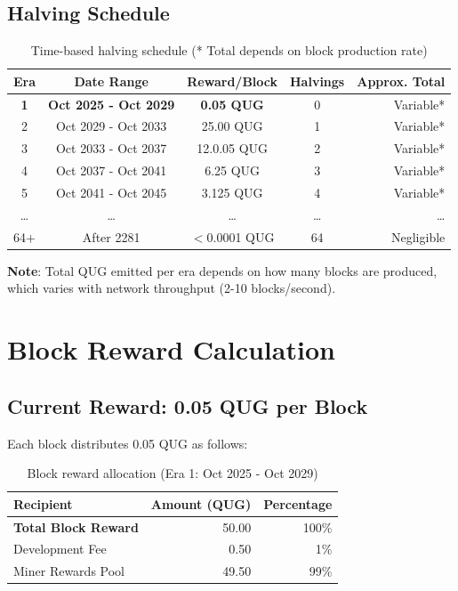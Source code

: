 \documentclass[11pt,a4paper]{article}
\begin{document}
\subsection{Halving Schedule}

\begin{table}[h]
\centering
\small
\begin{tabular}{ccccr}
\toprule
\textbf{Era} & \textbf{Date Range} & \textbf{Reward/Block} & \textbf{Halvings} & \textbf{Approx. Total} \\
\midrule
\textbf{1} & \textbf{Oct 2025 - Oct 2029} & \textbf{0.05 QUG} & 0 & Variable* \\
2 & Oct 2029 - Oct 2033 & 25.00 QUG & 1 & Variable* \\
3 & Oct 2033 - Oct 2037 & 12.0.05 QUG & 2 & Variable* \\
4 & Oct 2037 - Oct 2041 & 6.25 QUG & 3 & Variable* \\
5 & Oct 2041 - Oct 2045 & 3.125 QUG & 4 & Variable* \\
\dots & \dots & \dots & \dots & \dots \\
64+ & After 2281 & $<$0.0001 QUG & 64 & Negligible \\
\bottomrule
\end{tabular}
\caption{Time-based halving schedule (* Total depends on block production rate)}
\end{table}

\textbf{Note}: Total QUG emitted per era depends on how many blocks are produced, which varies with network throughput (2-10 blocks/second).

\section{Block Reward Calculation}

\subsection{Current Reward: 0.05 QUG per Block}

Each block distributes 0.05 QUG as follows:

\begin{table}[h]
\centering
\begin{tabular}{lrr}
\toprule
\textbf{Recipient} & \textbf{Amount (QUG)} & \textbf{Percentage} \\
\midrule
\textbf{Total Block Reward} & 50.00 & 100\% \\
\midrule
Development Fee & 0.50 & 1\% \\
Miner Rewards Pool & 49.50 & 99\% \\
\bottomrule
\end{tabular}
\caption{Block reward allocation (Era 1: Oct 2025 - Oct 2029)}
\end{table}
\end{document}
